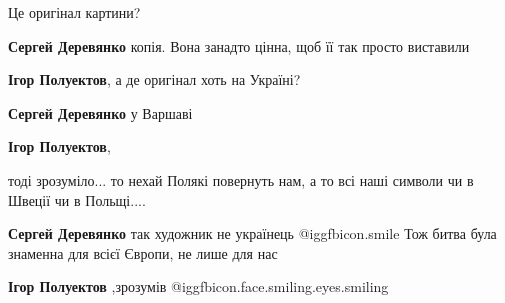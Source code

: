  
 
 
 
 

Це оригінал картини?

\textbf{Сергей Деревянко} копія. Вона занадто цінна, щоб її так просто виставили

\textbf{Ігор Полуектов}, а де оригінал хоть на Україні?

\textbf{Сергей Деревянко} у Варшаві

\textbf{Ігор Полуектов},

тоді зрозуміло... то нехай Полякі повернуть нам, а то всі наші символи чи в
Швеції чи в Польщі....

\textbf{Сергей Деревянко} так художник не українець  @igg{fbicon.smile} 
Тож битва була знаменна для всієї Європи, не лише для нас

\textbf{Ігор Полуектов} ,зрозумів  @igg{fbicon.face.smiling.eyes.smiling} 

